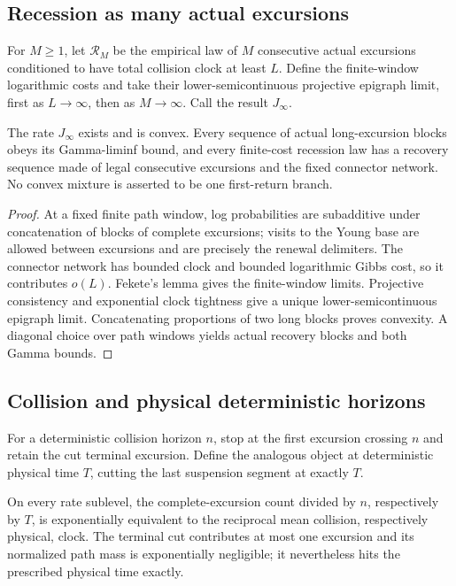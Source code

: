 \subsection{Recession as many actual excursions}

For \(M\ge1\), let \(\mathcal R_M\) be the empirical law of \(M\) consecutive
actual excursions conditioned to have total collision clock at least \(L\).
Define the finite-window logarithmic costs and take their lower-semicontinuous
projective epigraph limit, first as \(L\to\infty\), then as \(M\to\infty\).
Call the result \(J_\infty\).

\begin{theorem}
\label{thm:r10-a3-recession}
The rate \(J_\infty\) exists and is convex.  Every sequence of actual
long-excursion blocks obeys its Gamma-liminf bound, and every finite-cost
recession law has a recovery sequence made of legal consecutive excursions
and the fixed connector network.  No convex mixture is asserted to be one
first-return branch.
\end{theorem}

\begin{proof}
At a fixed finite path window, log probabilities are subadditive under
concatenation of blocks of complete excursions; visits to the Young base are
allowed between excursions and are precisely the renewal delimiters.  The
connector network has bounded clock and bounded logarithmic Gibbs cost, so it
contributes \(o(L)\).  Fekete's lemma gives the finite-window limits.
Projective consistency and exponential clock tightness give a unique
lower-semicontinuous epigraph limit.  Concatenating proportions of two long
blocks proves convexity.  A diagonal choice over path windows yields actual
recovery blocks and both Gamma bounds.
\end{proof}

\subsection{Collision and physical deterministic horizons}

For a deterministic collision horizon \(n\), stop at the first excursion
crossing \(n\) and retain the cut terminal excursion.  Define the analogous
object at deterministic physical time \(T\), cutting the last suspension
segment at exactly \(T\).

\begin{lemma}
\label{lem:r10-a3-clock}
On every rate sublevel, the complete-excursion count divided by \(n\),
respectively by \(T\), is exponentially equivalent to the reciprocal mean
collision, respectively physical, clock.  The terminal cut contributes at
most one excursion and its normalized path mass is exponentially negligible;
it nevertheless hits the prescribed physical time exactly.
\end{lemma}

